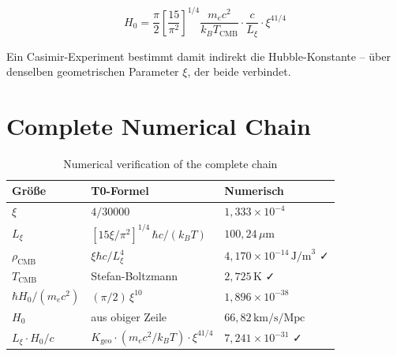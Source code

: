 \begin{equation}
    H_0 = \frac{\pi}{2}\left[\frac{15}{\pi^2}\right]^{1/4}
          \frac{m_e c^2}{k_B T_\text{CMB}}
          \cdot \frac{c}{L_\xi} \cdot \xi^{41/4}
    \label{eq:H0_from_Casimir}
\end{equation}

Ein Casimir-Experiment bestimmt damit indirekt die Hubble-Konstante --
über denselben geometrischen Parameter $\xi$, der beide verbindet.

\section{Complete Numerical Chain}
\label{sec:numerical}

\begin{table}[H]
    \centering
    \caption{Numerical verification of the complete chain}
    \label{tab:numerical}
    \begin{tabular}{lll}
        \toprule
        \textbf{Größe} & \textbf{T0-Formel} & \textbf{Numerisch} \\
        \midrule
        $\xi$                      & $4/30000$                       & $1{,}333 \times 10^{-4}$ \\
        $L_\xi$                    & $[15\xi/\pi^2]^{1/4}\,\hbar c/(k_B T)$
                                                                      & $100{,}24\,\mu\text{m}$ \\
        $\rho_\text{CMB}$          & $\xi\hbar c/L_\xi^4$            & $4{,}170 \times 10^{-14}\,\text{J/m}^3$ ✓ \\
        $T_\text{CMB}$             & Stefan-Boltzmann                & $2{,}725\,\text{K}$ ✓ \\
        $\hbar H_0/(m_e c^2)$      & $(\pi/2)\,\xi^{10}$             & $1{,}896 \times 10^{-38}$ \\
        $H_0$                      & aus obiger Zeile                & $66{,}82\,\text{km/s/Mpc}$ \\
        $L_\xi \cdot H_0/c$        & $K_\text{geo} \cdot (m_e c^2/k_BT) \cdot \xi^{41/4}$
                                                                      & $7{,}241 \times 10^{-31}$ ✓ \\
        \bottomrule
    \end{tabular}
\end{table}

